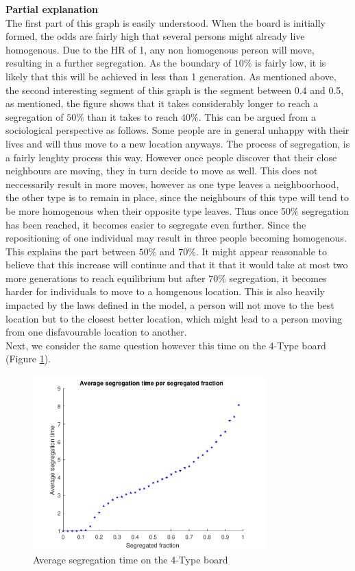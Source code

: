 \textbf{Partial explanation} \\
The first part of this graph is easily understood. 
When the board is initially formed, the odds are fairly high that several persons might already live homogenous. Due to the HR of 1, any non homogenous person will move, resulting in a further segregation. As the boundary of \(10\%\) is fairly low, it is likely that this will be achieved in less than 1 generation. 
As mentioned above, the second interesting segment of this graph is the segment between 0.4 and 0.5, as mentioned, the figure shows that it takes considerably longer to reach a segregation of \(50\%\) than it takes to reach \(40\%\). 
This can be argued from a sociological perspective as follows. Some people are in general unhappy with their lives and will thus move to a new location anyways. The process of segregation, is a fairly lenghty process this way. However once people discover that their close neighbours are moving, they in turn decide to move as well. 
This does not neccessarily result in more moves, however as one type leaves a neighboorhood, the other type is to remain in place, since the neighbours of this type will tend to be more homogenous when their opposite type leaves.
Thus once 50$\%$ segregation has been reached, it becomes easier to segregate even further. Since the repositioning of one individual may result in three people becoming homogenous. This explains the part between $50\%$ and $70\%$. It might appear reasonable to believe that this increase will continue and that it that it would take at most two more generations to reach equilibrium but after $70\%$ segregation, it becomes harder for individuals to move to a homgenous location.
 This is also heavily impacted by the laws defined in the model, a person will not move to the best location but to the closest better location, which might lead to a person moving from one disfavourable location to another. \\

Next, we consider the same question however this time on the 4-Type board (Figure \ref{fig:aveseg4b}).


 \begin{figure}[H]
    \centering
    \includegraphics[width=0.8\textwidth]{aveseg_4b_2}
    \caption{Average segregation time on the 4-Type board}
    \label{fig:aveseg4b}
\end{figure}

